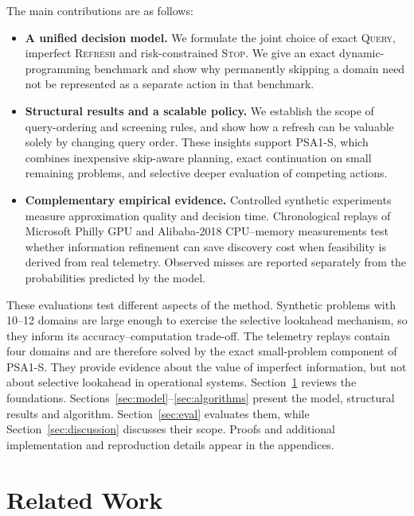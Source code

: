 \documentclass[conference]{IEEEtran}
\newcommand{\QUERY}{\textsc{Query}}
\newcommand{\REFRESH}{\textsc{Refresh}}
\newcommand{\STOP}{\textsc{Stop}}
\begin{document}
The main contributions are as follows:
\begin{itemize}
\item \textbf{A unified decision model.} We formulate the joint choice of exact \QUERY{}, imperfect \REFRESH{} and risk-constrained \STOP{}. We give an exact dynamic-programming benchmark and show why permanently skipping a domain need not be represented as a separate action in that benchmark.
\item \textbf{Structural results and a scalable policy.} We establish the scope of query-ordering and screening rules, and show how a refresh can be valuable solely by changing query order. These insights support PSA1-S, which combines inexpensive skip-aware planning, exact continuation on small remaining problems, and selective deeper evaluation of competing actions.
\item \textbf{Complementary empirical evidence.} Controlled synthetic experiments measure approximation quality and decision time. Chronological replays of Microsoft Philly GPU and Alibaba-2018 CPU--memory measurements test whether information refinement can save discovery cost when feasibility is derived from real telemetry. Observed misses are reported separately from the probabilities predicted by the model.
\end{itemize}

These evaluations test different aspects of the method. Synthetic problems with 10--12 domains are large enough to exercise the selective lookahead mechanism, so they inform its accuracy--computation trade-off. The telemetry replays contain four domains and are therefore solved by the exact small-problem component of PSA1-S. They provide evidence about the value of imperfect information, but not about selective lookahead in operational systems. Section~\ref{sec:related} reviews the foundations. Sections~\ref{sec:model}--\ref{sec:algorithms} present the model, structural results and algorithm. Section~\ref{sec:eval} evaluates them, while Section~\ref{sec:discussion} discusses their scope. Proofs and additional implementation and reproduction details appear in the appendices.

\section{Related Work}
\label{sec:related}
\end{document}

